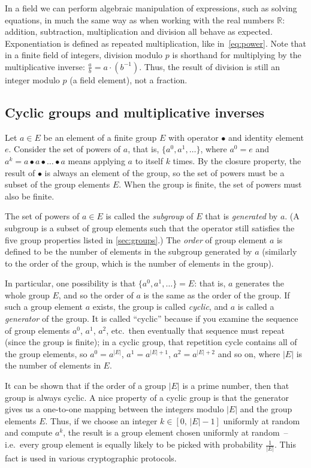 \documentclass[manuscript]{acmart}
\begin{document}
In a field we can perform algebraic manipulation of expressions, such as solving equations, in much the same way as when working with the real numbers $\mathbb{R}$: addition, subtraction, multiplication and division all behave as expected.
Exponentiation is defined as repeated multiplication, like in~\eqref{eq:power}.
Note that in a finite field of integers, division modulo $p$ is shorthand for multiplying by the multiplicative inverse: $\frac{a}{b} = a \cdot (b^{-1})$.
Thus, the result of division is still an integer modulo $p$ (a field element), not a fraction.

\subsection{Cyclic groups and multiplicative inverses}\label{sec:cyclic}

Let $a \in E$ be an element of a finite group $E$ with operator $\bullet$ and identity element $e$.
Consider the set of powers of $a$, that is, $\{a^0, a^1, \dots\}$, where $a^0 = e$ and $a^k = a \bullet a \bullet \dots \bullet a$ means applying $a$ to itself $k$ times.
By the closure property, the result of $\bullet$ is always an element of the group, so the set of powers must be a subset of the group elements $E$.
When the group is finite, the set of powers must also be finite.

The set of powers of $a \in E$ is called the \emph{subgroup} of $E$ that is \emph{generated} by $a$.
(A subgroup is a subset of group elements such that the operator still satisfies the five group properties listed in \autoref{sec:groups}.)
The \emph{order} of group element $a$ is defined to be the number of elements in the subgroup generated by $a$ (similarly to the order of the group, which is the number of elements in the group).

In particular, one possibility is that $\{a^0, a^1, \dots\} = E$: that is, $a$ generates the whole group $E$, and so the order of $a$ is the same as the order of the group.
If such a group element $a$ exists, the group is called \emph{cyclic}, and $a$ is called a \emph{generator} of the group.
It is called ``cyclic'' because if you examine the sequence of group elements $a^0$, $a^1$, $a^2$, etc.\ then eventually that sequence must repeat (since the group is finite); in a cyclic group, that repetition cycle contains all of the group elements, so $a^0 = a^{|E|}$, $a^1 = a^{|E|+1}$, $a^2 = a^{|E|+2}$ and so on, where $|E|$ is the number of elements in $E$.

It can be shown that if the order of a group $|E|$ is a prime number, then that group is always cyclic.
A nice property of a cyclic group is that the generator gives us a one-to-one mapping between the integers modulo $|E|$ and the group elements $E$.
Thus, if we choose an integer $k \in [0,\, |E|-1]$ uniformly at random and compute $a^k$, the result is a group element chosen uniformly at random~-- i.e.\ every group element is equally likely to be picked with probability $\frac{1}{|E|}$.
This fact is used in various cryptographic protocols.
\end{document}
